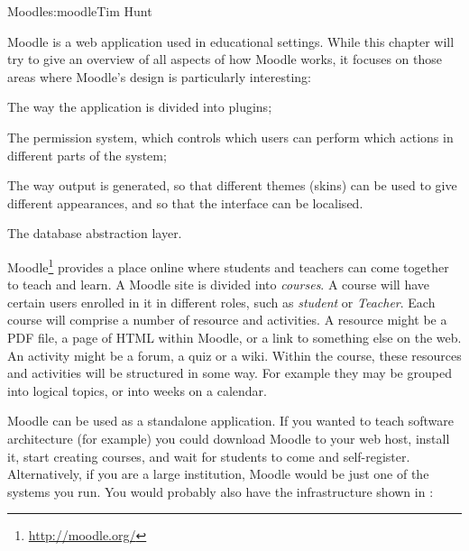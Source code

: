 \begin{aosachapter}{Moodle}{s:moodle}{Tim Hunt}

Moodle is a web application used in educational settings. While this chapter will
try to give an overview of all aspects of how Moodle works, it
focuses on those areas where Moodle's design is particularly
interesting:

\begin{aosaenumerate}

\item The way the application is divided into plugins;

\item The permission system, which controls which users can perform
  which actions in different parts of the system;

\item The way output is generated, so that different themes (skins)
  can be used to give different appearances, and so that the interface
  can be localised.

\item The database abstraction layer.

\end{aosaenumerate}

Moodle\footnote{\url{http://moodle.org/}} provides a place online
where students and teachers can come together to teach and learn. A
Moodle site is divided into \emph{courses}. A course will have certain users
enrolled in it in different roles, such as \emph{student} or \emph{Teacher}. Each
course will comprise a number of resource and activities. A resource
might be a PDF file, a page of HTML within Moodle, or a link to
something else on the web. An activity might be a forum, a quiz or a
wiki. Within the course, these resources and activities will be
structured in some way. For example they may be grouped into logical
topics, or into weeks on a calendar.


Moodle can be used as a standalone application. If you wanted to
teach software architecture (for example) you could download Moodle to
your web host, install it, start creating courses, and wait for
students to come and self-register. Alternatively, if you are a large
institution, Moodle would be just one of the systems you run. You
would probably also have the infrastructure shown in
:



\end{aosachapter}
